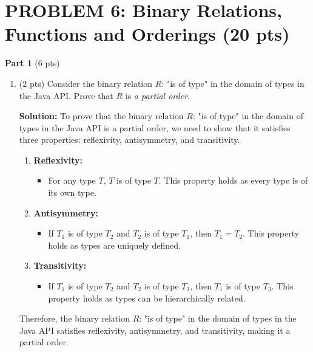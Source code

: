 \documentclass[12pt]{article}
\begin{document}
\begin{spacing}{1.5}
\begin{enumerate}
	\end{enumerate}
		     
	\newpage
	\section*{PROBLEM 6: Binary Relations, Functions and Orderings (20 pts)}
	
	\textbf{Part 1} (6 pts)
	
	\begin{enumerate}
		\item (2 pts) Consider the binary relation $R$: "is of type" in the domain of types in the Java API. Prove that $R$ is \textit{a partial order}.
		      
		      \textbf{Solution:} To prove that the binary relation $R$: "is of type" in the domain of types in the Java API is a partial order, we need to show that it satisfies three properties: reflexivity, antisymmetry, and transitivity.
		      
		      \begin{enumerate}
		      	\item \textbf{Reflexivity:}
		      	      \begin{itemize}
		      	      	\item For any type $T$, $T$ is of type $T$. This property holds as every type is of its own type.
		      	      \end{itemize}
		      	      
		      	\item \textbf{Antisymmetry:}
		      	      \begin{itemize}
		      	      	\item If $T_1$ is of type $T_2$ and $T_2$ is of type $T_1$, then $T_1 = T_2$. This property holds as types are uniquely defined.
		      	      \end{itemize}
		      	      
		      	\item \textbf{Transitivity:}
		      	      \begin{itemize}
		      	      	\item If $T_1$ is of type $T_2$ and $T_2$ is of type $T_3$, then $T_1$ is of type $T_3$. This property holds as types can be hierarchically related.
		      	      \end{itemize}
		      \end{enumerate}
		      
		      Therefore, the binary relation $R$: "is of type" in the domain of types in the Java API satisfies reflexivity, antisymmetry, and transitivity, making it a partial order. 
		      

\end{enumerate}
\end{spacing}
\end{document}
